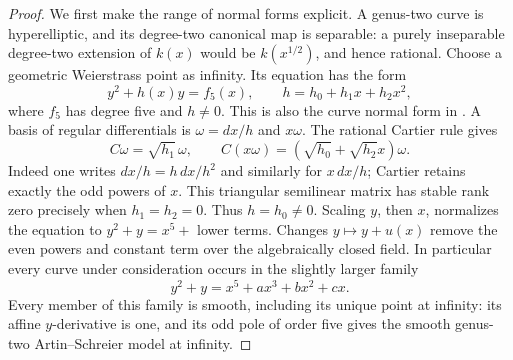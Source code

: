 \begin{proof}
We first make the range of normal forms explicit. A genus-two curve
is hyperelliptic, and its degree-two canonical map is separable:
a purely inseparable degree-two extension of $k(x)$ would be
$k(x^{1/2})$, and hence rational. Choose a geometric Weierstrass
point as infinity. Its equation has the form
\[
       y^2+h(x)y=f_5(x),\qquad
       h=h_0+h_1x+h_2x^2,
\]
where $f_5$ has degree five and $h\ne0$. This is also the curve
normal form in \citet[Proposition~2.1]{RainsSam2018Trivectors}.
A basis of regular differentials is $\omega=dx/h$ and $x\omega$.
The rational Cartier rule gives
\[
 C\omega=\sqrt{h_1}\,\omega,
 \qquad C(x\omega)=(\sqrt{h_0}+\sqrt{h_2}x)\omega.
\]
Indeed one writes $dx/h=h\,dx/h^2$ and similarly for $x\,dx/h$;
Cartier retains exactly the odd powers of $x$. This triangular
semilinear matrix has stable rank zero precisely when
$h_1=h_2=0$. Thus $h=h_0\ne0$. Scaling $y$, then $x$, normalizes
the equation to $y^2+y=x^5+$ lower terms. Changes $y\mapsto y+u(x)$
remove the even powers and constant term over the algebraically
closed field. In particular every curve under consideration occurs
in the slightly larger family
\begin{equation}\label{eq:p-rank-zero-normal-form-candidate}
                  y^2+y=x^5+a x^3+b x^2+c x.
\end{equation}
Every member of this family is smooth, including its unique point
at infinity: its affine $y$-derivative is one, and its odd pole of
order five gives the smooth genus-two Artin--Schreier model at infinity.


\end{proof}
